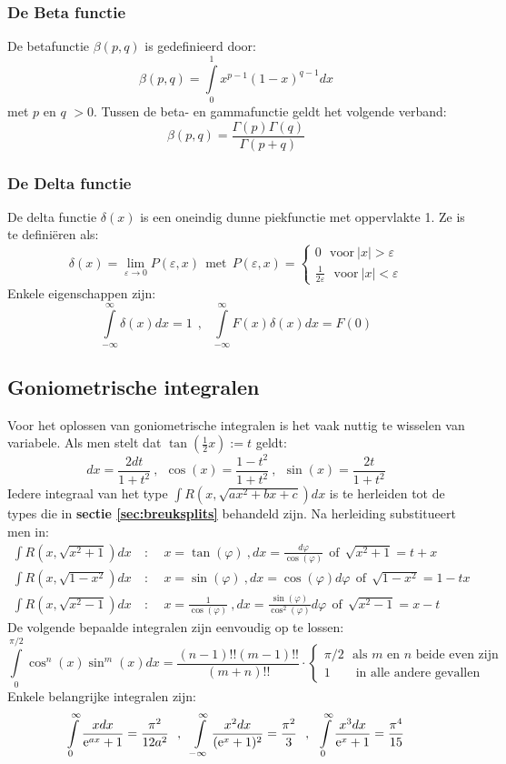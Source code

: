 \subsubsection{De Beta functie}
De betafunctie $\beta(p,q)$ is gedefinieerd door:
\[
\beta(p,q)=\int\limits_0^1x^{p-1}(1-x)^{q-1}dx
\]
met $p$ en $q$ $>0$. Tussen de beta- en gammafunctie geldt het volgende
verband:
\[
\beta(p,q)=\frac{\Gamma(p)\Gamma(q)}{\Gamma(p+q)}
\]

\subsubsection{De Delta functie}
De delta functie $\delta(x)$ is een oneindig dunne piekfunctie met oppervlakte
1. Ze is te defini\"eren als:
\[
\delta(x)=\lim_{\varepsilon\rightarrow0}P(\varepsilon,x)~~\mbox{met}~~
P(\varepsilon,x)=\left\{
\begin{array}{l}
0~~~\mbox{voor}~|x|>\varepsilon\\
\displaystyle\frac{1}{2\varepsilon}~~~\mbox{voor}~|x|<\varepsilon
\end{array}\right.
\]
Enkele eigenschappen zijn:
\[
\int\limits_{-\infty}^\infty\delta(x)dx=1~~,~~~
\int\limits_{-\infty}^\infty F(x)\delta(x)dx=F(0)
\]

\subsection{Goniometrische integralen}
Voor het oplossen van goniometrische integralen is het vaak nuttig te wisselen
van variabele. Als men stelt dat $\tan(\frac{1}{2}x):=t$ geldt:
\[
dx=\frac{2dt}{1+t^2}~,~~\cos(x)=\frac{1-t^2}{1+t^2}~,~~\sin(x)=\frac{2t}{1+t^2}
\]
Iedere integraal van het type $\int R(x,\sqrt{ax^2+bx+c})dx$ is te herleiden
tot de types die in {\bf sectie \ref{sec:breuksplits}} behandeld zijn. Na
herleiding substitueert men in:
\begin{eqnarray*}
\int R(x,\sqrt{x^2+1})dx&~:~~&x=\tan(\varphi)          ~,dx=\frac{d\varphi}{\cos(\varphi)}               ~~\mbox{of}~~\sqrt{x^2+1}=t+x\\
\int R(x,\sqrt{1-x^2})dx&~:~~&x=\sin(\varphi)          ~,dx=\cos(\varphi)d\varphi                        ~~\mbox{of}~~\sqrt{1-x^2}=1-tx\\
\int R(x,\sqrt{x^2-1})dx&~:~~&x=\frac{1}{\cos(\varphi)}~,dx=\frac{\sin(\varphi)}{\cos^2(\varphi)}d\varphi~~\mbox{of}~~\sqrt{x^2-1}=x-t
\end{eqnarray*}
De volgende bepaalde integralen zijn eenvoudig op te lossen:
\[
\int\limits_0^{\pi/2}\cos^n(x)\sin^m(x)dx=\frac{(n-1)!!(m-1)!!}{(m+n)!!}\cdot
\left\{\begin{array}{l}
\pi/2\mbox{~~als $m$ en $n$ beide even zijn}\\
1\mbox{~~~~~~in alle andere gevallen}
\end{array}\right.
\]
Enkele belangrijke integralen zijn:
\[
\int\limits_0^\infty\frac{xdx}{{\rm e}^{ax}+1}=\frac{\pi^2}{12a^2}~~,~~
\int\limits_{-\infty}^\infty\frac{x^2dx}{({\rm e}^x+1)^2}=\frac{\pi^2}{3}~~,~~
\int\limits_0^\infty\frac{x^3dx}{{\rm e}^x+1}=\frac{\pi^4}{15}
\]

